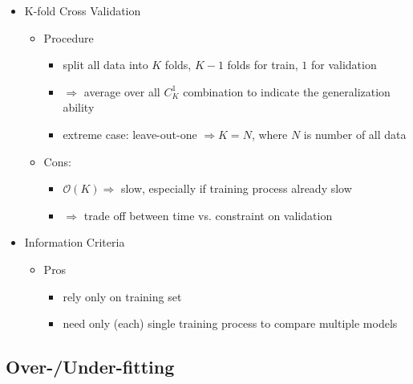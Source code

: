 \begin{itemize}
\item K-fold Cross Validation
	\begin{itemize}
	\item Procedure
		\begin{itemize}
		\item split all data into $K$ folds, $K-1$ folds for train, $1$ for validation
		
		\item $\Rightarrow$ average over all $C^1_K$ combination to indicate the generalization ability
	
		\item extreme case: leave-out-one $\Rightarrow K=N$, where $N$ is number of all data
		\end{itemize}
	
	\item Cons: 
		\begin{itemize}
		\item $\mathcal O(K) \Rightarrow$ slow, especially if training process already slow
		\item $\Rightarrow$ trade off between time vs. constraint on validation
		\end{itemize}
	\end{itemize}

\item Information Criteria
	\begin{itemize}
	\item Pros
		\begin{itemize}
		\item rely only on training set
		\item need only (each) single training process to compare multiple models
		\end{itemize}
	\end{itemize}

\end{itemize}


\subsection{Over-/Under-fitting}
